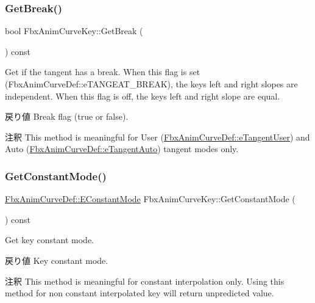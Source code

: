 \subsubsection{\texorpdfstring{Get\+Break()}{GetBreak()}}
{\footnotesize\ttfamily bool Fbx\+Anim\+Curve\+Key\+::\+Get\+Break (\begin{DoxyParamCaption}{ }\end{DoxyParamCaption}) const}

Get if the tangent has a break. When this flag is set (Fbx\+Anim\+Curve\+Def\+::e\+T\+A\+N\+G\+E\+A\+T\+\_\+\+B\+R\+E\+AK), the key\textquotesingle{}s left and right slopes are independent. When this flag is off, the key\textquotesingle{}s left and right slope are equal. \begin{DoxyReturn}{戻り値}
Break flag ({\ttfamily true} or {\ttfamily false}). 
\end{DoxyReturn}
\begin{DoxyRemark}{注釈}
This method is meaningful for User (\hyperlink{class_fbx_anim_curve_def_ac810ccc5ca0527704ab5175479964b87a199cb16b2c861b12c334093ce796cb86}{Fbx\+Anim\+Curve\+Def\+::e\+Tangent\+User}) and Auto (\hyperlink{class_fbx_anim_curve_def_ac810ccc5ca0527704ab5175479964b87a56e3bad364851277281e94e81327dd25}{Fbx\+Anim\+Curve\+Def\+::e\+Tangent\+Auto}) tangent modes only. 
\end{DoxyRemark}
\mbox{\label{class_fbx_anim_curve_key_ade9ff492dbe914f25b6a0404d0121a83}} 
\subsubsection{\texorpdfstring{Get\+Constant\+Mode()}{GetConstantMode()}}
{\footnotesize\ttfamily \hyperlink{class_fbx_anim_curve_def_a52885abd392ac8ac3da94bafc5fddd64}{Fbx\+Anim\+Curve\+Def\+::\+E\+Constant\+Mode} Fbx\+Anim\+Curve\+Key\+::\+Get\+Constant\+Mode (\begin{DoxyParamCaption}{ }\end{DoxyParamCaption}) const}

Get key constant mode. \begin{DoxyReturn}{戻り値}
Key constant mode. 
\end{DoxyReturn}
\begin{DoxyRemark}{注釈}
This method is meaningful for constant interpolation only. Using this method for non constant interpolated key will return unpredicted value. 
\end{DoxyRemark}
\mbox{\label{class_fbx_anim_curve_key_a3185c35241a072105f14327afd275452}} 
